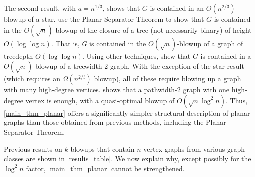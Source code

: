 \documentclass{patmorin}
\begin{document}
The second result, with $a=n^{1/3}$, shows that $G$ is contained in an $O(n^{2/3})$-blowup of a star. \citet{DvoWoo} use the Planar Separator Theorem to show that $G$ is contained in the $O(\sqrt{n})$-blowup of the closure of a tree (not necessarily binary) of height $O(\log\log n)$. That is, $G$ is contained in the $O(\sqrt{n})$-blowup of a graph of treedepth $O(\log\log n)$.  Using other techniques, \citet{distel.dujmovic.ea:product} show that $G$ is contained in a $O(\sqrt{n})$-blowup of a treewidth-$2$ graph.  With the exception of the star result (which requires an $\Omega(n^{2/3})$ blowup), all of these require blowing up a graph with many high-degree vertices.   shows that a pathwidth-$2$ graph with one high-degree vertex is enough, with a quasi-optimal blowup of $O(\sqrt{n}\log^2 n)$.  Thus, \cref{main_thm_planar} offers a significantly simpler structural description of planar graphs than those obtained from previous methods, including the Planar Separator Theorem.


Previous results on $k$-blowups that contain $n$-vertex graphs from various graph classes are shown in \cref{results_table}.  We now explain why, except possibly for the $\log^2 n$ factor, \cref{main_thm_planar} cannot be strengthened.
\end{document}
